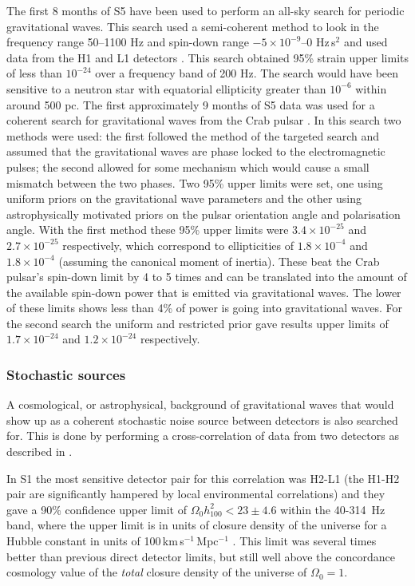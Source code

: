 \documentclass{article}
\begin{document}
The first 8 months of S5 have been used to perform an all-sky search for
periodic gravitational waves. This search used a semi-coherent method to look
in the frequency range 50--1100 Hz and spin-down range $-5\times10^{-9}$--0
Hz\,s$^2$ and used data from the H1 and L1 detectors \cite{Abbott:2008i}. This
search obtained 95\% strain upper limits of less than $10^{-24}$ over a
frequency band of 200 Hz. The search would have been sensitive to a neutron star
with equatorial ellipticity greater than $10^{-6}$ within around 500 pc. The
first approximately 9 months of S5 data was used for a coherent search for
gravitational waves from the Crab pulsar \cite{Abbott:2008j}. In this search two
methods were used: the first followed the method of the targeted search and
assumed that the gravitational waves are phase locked to the electromagnetic
pulses; the second allowed for some mechanism which would cause a small mismatch
between the two phases. Two 95\% upper limits were set, one using uniform priors
on the gravitational wave parameters and the other using astrophysically
motivated priors on the pulsar orientation angle and polarisation angle. With
the first method these 95\% upper limits were $3.4\times10^{-25}$ and
$2.7\times10^{-25}$ respectively, which correspond to ellipticities of
$1.8\times10^{-4}$ and $1.8\times10^{-4}$ (assuming the canonical moment of
inertia). These beat the Crab pulsar's spin-down limit by 4 to 5 times and can
be translated into the amount of the available spin-down power that is
emitted via gravitational waves. The lower of these limits shows less than 4\%
of power is going into gravitational waves. For the second search the uniform
and restricted prior gave results upper limits of $1.7\times10^{-24}$ and
$1.2\times10^{-24}$ respectively.

\subsubsection{Stochastic sources}
A cosmological, or astrophysical, background of gravitational waves that would
show up as a coherent stochastic noise source between detectors is also searched
for. This is done by performing a cross-correlation of data from two detectors
as described in \cite{Allen:1999}.

In S1 the most sensitive detector pair for this correlation was H2-L1 (the
H1-H2 pair are significantly hampered by local environmental correlations) and
they gave a 90\% confidence upper limit of $\Omega_0h^2_{100} < 23\pm4.6$ within
the 40-314~Hz band, where the upper limit is in units of closure density of the
universe for a Hubble constant in units of 100\,km\,s$^{-1}$\,Mpc$^{-1}$
\cite{Abbott:2004e}. This limit was several times better than previous direct
detector limits, but still well above the concordance cosmology value of the
{\it total} closure density of the universe of $\Omega_0=1$.
\end{document}
